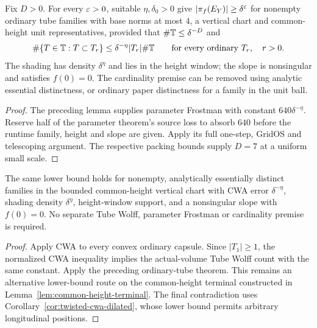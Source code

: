\begin{theorem}
\label{thm:twisted-ordinary-common-height}
\leanok
{}
Fix $D>0$. For every $\varepsilon>0$, suitable $\eta,\delta_0>0$ give
$|\pi_f(E_Y)|\geq\delta^\varepsilon$ for nonempty ordinary tube families
with base norms at most $4$, a vertical chart and common-height unit
representatives, provided that $\#\mathbb{T}\leq\delta^{-D}$ and
\[
 \#\{T\in\mathbb{T}:T\subset T_r\}\leq\delta^{-\eta}|T_r|\#\mathbb{T}
       \qquad\text{for every ordinary }T_r,\quad r>0.
\]
The shading has density $\delta^\eta$ and lies in the height window;
the slope is nonsingular and satisfies $f(0)=0$.
The cardinality premise can be removed using analytic essential
distinctness, or ordinary paper distinctness for a family in the unit ball.
\end{theorem}
\begin{proof}
\leanok
The preceding lemma supplies parameter Frostman with constant
$640\delta^{-\eta}$. Reserve half of the parameter theorem's source
loss to absorb $640$ before the runtime family, height and slope are
given. Apply its full one-step, GridOS and telescoping argument.
The respective packing bounds supply $D=7$ at a uniform small scale.
\end{proof}

\begin{corollary}
\label{cor:twisted-cwa-common-height}
\leanok
{}
The same lower bound holds for nonempty, analytically essentially distinct
families in the bounded common-height vertical chart with CWA error
$\delta^{-\eta}$, shading density $\delta^\eta$, height-window support,
and a nonsingular slope with $f(0)=0$. No separate Tube Wolff,
parameter Frostman or cardinality premise is required.
\end{corollary}
\begin{proof}
\leanok
Apply CWA to every convex ordinary capsule. Since $|T_1|\geq1$,
the normalized CWA inequality implies the actual-volume Tube Wolff count
with the same constant. Apply the preceding ordinary-tube theorem.
This remains an alternative lower-bound route on the common-height
terminal constructed in Lemma~\ref{lem:common-height-terminal}.
The final contradiction uses Corollary~\ref{cor:twisted-cwa-dilated},
whose lower bound permits arbitrary longitudinal positions.
\end{proof}


